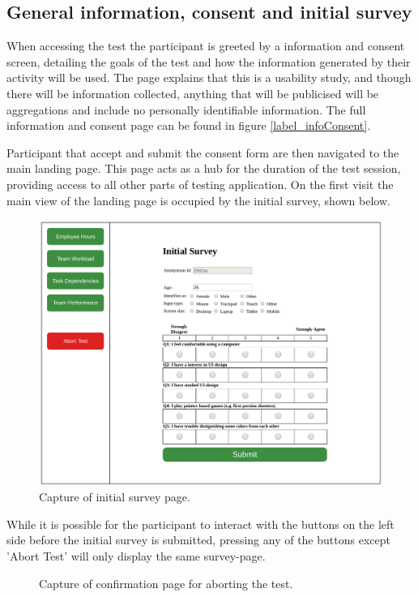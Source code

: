{  \subsection{General information, consent and initial survey}

  When accessing the test the participant is greeted by a information and
  consent screen, detailing the goals of the test and how the information
  generated by their activity will be used. The page explains that this
  is a usability study, and though there will be information collected,
  anything that will be publicised will be aggregations and include no
  personally identifiable information. The full information and consent
  page can be found in figure \ref{label_infoConsent}.

  Participant that accept and submit the consent form are then navigated
  to the main landing page. This page acts as a hub for the duration of
  the test session, providing access to all other parts of testing
  application. On the first visit the main view of the landing page is
  occupied by the initial survey, shown below.

  \begin{figure}[h!]
    \centering
    \includegraphics[width=.7\textwidth]{figures/captures/webapp_pre_survey.pdf}
    \caption{Capture of initial survey page.}
    \label{label_preSurvey}
  \end{figure}

  While it is possible for the participant to interact with the buttons on
  the left side before the initial survey is submitted, pressing any of the
  buttons except 'Abort Test' will only display the same survey-page.

  \begin{figure}[h!]
    \centering
    \caption{Capture of confirmation page for aborting the test.}
    \label{label_abort}
  \end{figure}

}
